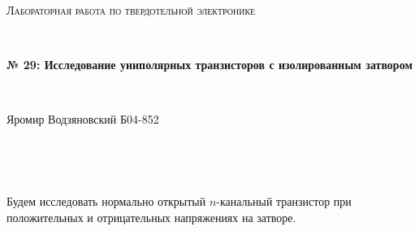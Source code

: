 \documentclass[a4paper]{article}
\begin{document}
\graphicspath{ {pic/} }
\begin{center}
    {\scshape\Large Лабораторная работа по твердотельной электронике} \par

    \

    {\huge\bfseries № 29: Исследование униполярных транзисторов с изолированным затвором} \par 

    \

    {\large Яромир Водзяновский Б04-852}
\end{center}

\

\

Будем исследовать нормально открытый $n$-канальный транзистор при положительных и отрицательных напряжениях на затворе.  
\end{document}
